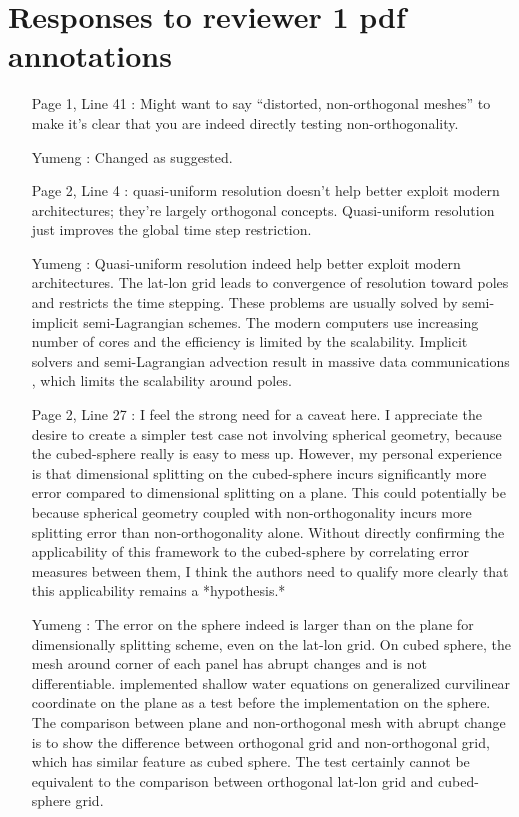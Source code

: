 \documentclass[12pt]{article}
\begin{document}
\section*{Responses to reviewer 1 pdf annotations}

\begin{enumerate}
\item [Page 1, Line 41]: Might want to say ``distorted, non-orthogonal meshes'' to make it's clear that you are indeed directly testing non-orthogonality.

\item [Yumeng]: Changed as suggested.

\item [Page 2, Line 4]: quasi-uniform resolution doesn't help better exploit modern architectures; they're largely orthogonal concepts. Quasi-uniform resolution just improves the global time step restriction.

\item [Yumeng]: Quasi-uniform resolution indeed help better exploit modern architectures. The lat-lon grid leads to convergence of resolution toward poles and restricts the time stepping. These problems are usually solved by semi-implicit semi-Lagrangian schemes. The modern computers use increasing number of cores and the efficiency is limited by the scalability. Implicit solvers and semi-Lagrangian advection result in massive data communications \citep{ST12}, which limits the scalability around poles.

\item [Page 2, Line 27]: I feel the strong need for a caveat here. I appreciate the desire to create a simpler test case not involving spherical geometry, because the cubed-sphere really is easy to mess up. However, my personal experience is that dimensional splitting  on the cubed-sphere incurs significantly more error compared to dimensional splitting on a plane. This could potentially be because spherical geometry coupled with non-orthogonality incurs more splitting error than non-orthogonality alone. Without directly confirming the applicability of this framework to the cubed-sphere by correlating error measures between them, I think the authors need to qualify more clearly that this applicability remains a *hypothesis.*

\item [Yumeng]: The error on the sphere indeed is larger than on the plane for dimensionally splitting scheme, even on the lat-lon grid. On cubed sphere, the mesh around corner of each panel has abrupt changes and is not differentiable. \cite{TN17} implemented shallow water equations on generalized curvilinear coordinate on the plane as a test before the implementation on the sphere. The comparison between plane and non-orthogonal mesh with abrupt change is to show the difference between orthogonal grid and non-orthogonal grid, which has similar feature as cubed sphere. The test certainly cannot be equivalent to the comparison between orthogonal lat-lon grid and cubed-sphere grid.


\end{enumerate}
\end{document}

